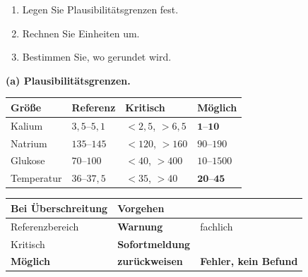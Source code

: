 \begin{aufgabe}
\begin{enumerate}[label=(\alph*)]
\item Legen Sie Plausibilitätsgrenzen fest.
\item Rechnen Sie Einheiten um.
\item Bestimmen Sie, wo gerundet wird.
\end{enumerate}

\loesung
\textbf{(a) Plausibilitätsgrenzen.}

\begin{center}
{\small
\renewcommand{\arraystretch}{1.45}
\begin{tabular}{@{}P{2.6cm}P{2.0cm}P{2.0cm}P{2.0cm}@{}}
\toprule
\textbf{Größe} & \textbf{Referenz} & \textbf{Kritisch} & \textbf{Möglich}\\
\midrule
Kalium & $3{,}5$--$5{,}1$ & $<2{,}5$, $>6{,}5$ & $\mathbf{1}$--$\mathbf{10}$\\
Natrium & $135$--$145$ & $<120$, $>160$ & $90$--$190$\\
Glukose & $70$--$100$ & $<40$, $>400$ & $10$--$1500$\\
Temperatur & $36$--$37{,}5$ & $<35$, $>40$ & $\mathbf{20}$--$\mathbf{45}$\\
\bottomrule
\end{tabular}}
\end{center}

\begin{center}
\begin{minipage}{0.88\textwidth}
\end{minipage}
\end{center}

\begin{center}
\renewcommand{\arraystretch}{1.45}
\begin{tabular}{@{}P{3.2cm}P{2.4cm}P{2.2cm}@{}}
\toprule
\textbf{Bei Über\-schreitung} & \textbf{Vorgehen} & \\
\midrule
Referenzbereich & \textbf{Warnung} & \textcolor{gruen}{fachlich}\\
Kritisch & \textbf{Sofort\-meldung} & \\
\textbf{Möglich} & \textcolor{akzent}{\textbf{zurückweisen}} & \textcolor{akzent}{\textbf{Fehler, kein Befund}}\\
\bottomrule
\end{tabular}
\end{center}


\end{aufgabe}
